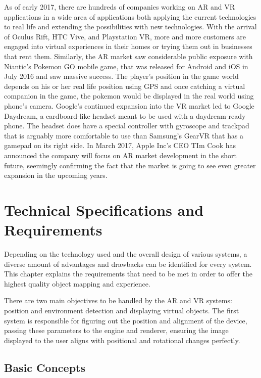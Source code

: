 \documentclass[12pt, a4paper]{article}
\begin{document}
As of early 2017, there are hundreds of companies working on AR and VR applications in a wide area of applications both applying the current technologies to real life and extending the possibilities with new technologies. With the arrival of Oculus Rift, HTC Vive, and Playstation VR, more and more customers are engaged into virtual experiences in their homes or trying them out in businesses that rent them. Similarly, the AR market saw considerable public exposure with Niantic’s Pokemon GO mobile game, that was released for Android and iOS in July 2016 and saw massive success. The player’s position in the game world depends on his or her real life position using GPS and once catching a virtual companion in the game, the pokemon would be displayed in the real world using phone’s camera. Google’s continued expansion into the VR market led to Google Daydream, a cardboard-like headset meant to be used with a daydream-ready phone. The headset does have a special controller with gyroscope and trackpad that is arguably more comfortable to use than Samsung’s GearVR that has a gamepad on its right side. In March 2017, Apple Inc’s CEO TIm Cook has announced the company will focus on AR market development in the short future, seemingly confirming the fact that the market is going to see even greater expansion in the upcoming years.

\section{Technical Specifications and Requirements}

Depending on the technology used and the overall design of various systems, a diverse amount of advantages and drawbacks can be identified for every system. This chapter explains the requirements that need to be met in order to offer the highest quality object mapping and experience. 

There are two main objectives to be handled by the AR and VR systems: position and environment detection and displaying virtual objects. The first system is responsible for figuring out the position and alignment of the device, passing these parameters to the engine and renderer, ensuring the image displayed to the user aligns with positional and rotational changes perfectly.

\subsection{Basic Concepts}
\end{document}
